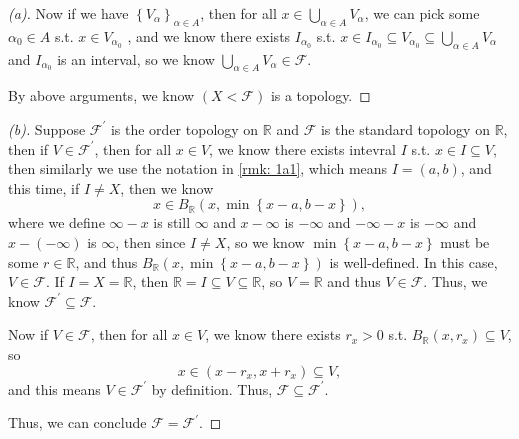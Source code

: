 \begin{proof}[(a)]
  Now if we have \(\left\{ V_\alpha  \right\}_{\alpha \in A} \), then for all \(x \in \bigcup_{\alpha \in A} V_\alpha  \), we can pick some \(\alpha_0 \in A\) s.t. \(x \in V_{\alpha _0}\) , and we know there exists \(I_{\alpha _0}\) s.t. \(x \in I_{\alpha _0} \subseteq V_{\alpha _0} \subseteq \bigcup_{\alpha \in A} V_\alpha  \) and \(I_{\alpha _0}\) is an interval, so we know \(\bigcup_{\alpha \in A} V_\alpha \in \mathcal{F}  \). 
  
  By above arguments, we know \((X< \mathcal{F} )\) is a topology. 
\end{proof}
\begin{proof}[(b)]
  Suppose \(\mathcal{F} ^{\prime} \) is the order topology on \(\mathbb{R} \) and \(\mathcal{F} \) is the standard topology on \(\mathbb{R}  \), then if \(V \in \mathcal{F} ^{\prime} \), then for all \(x \in V\), we know there exists intevral \(I\) s.t. \(x \in I \subseteq V\), then similarly we use the notation in \autoref{rmk: 1a1}, which means \(I = (a, b)\), and this time, if \(I \neq X\), then we know 
  \[
    x \in B_{\mathbb{R} }(x, \min \left\{ x - a, b - x \right\} ),
  \] where we define \(\infty - x\) is still \(\infty \) and \(x - \infty \) is \(-\infty \) and \(-\infty - x\) is \(-\infty \) and \(x - (-\infty )\) is \(\infty \), then since \(I \neq X\), so we know \(\min \left\{ x - a, b - x \right\}\) must be some \(r \in \mathbb{R} \), and thus \(B_{\mathbb{R} } (x, \min \left\{ x-a, b-x \right\} )\) is well-defined. In this case, \(V \in \mathcal{F} \). If \(I = X = \mathbb{R} \), then \(\mathbb{R} = I \subseteq V \subseteq \mathbb{R}  \), so \(V = \mathbb{R} \) and thus \(V \in \mathcal{F} \). Thus, we know \(\mathcal{F} ^{\prime} \subseteq \mathcal{F} \).      
  
  Now if \(V \in \mathcal{F} \), then for all \(x \in V\), we know there exists \(r_x > 0\) s.t. \(B_{\mathbb{R} }(x, r_x) \subseteq V\), so 
  \[
    x \in (x - r_x, x + r_x) \subseteq V,
  \] and this means \(V \in \mathcal{F} ^{\prime} \) by definition. Thus, \(\mathcal{F} \subseteq \mathcal{F} ^{\prime} \). 
  
  Thus, we can conclude \(\mathcal{F} = \mathcal{F} ^{\prime} \). 
\end{proof}
